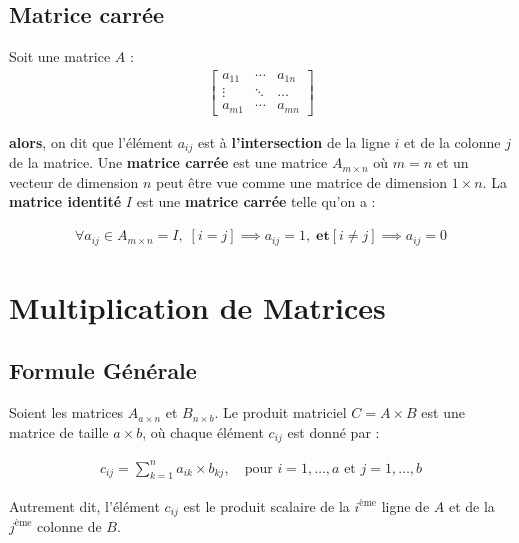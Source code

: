 \documentclass{report}
\begin{document}
\begin{multicols*}{2}
\subsection{Matrice carrée}

    Soit une matrice $A$ : 
        \begin{align*}
                        \begin{bmatrix} 
            a_{11} &  \cdots & a_{1n}  \\ 
            \vdots &  \ddots & \ldots \\ 
            a_{m1} &  \cdots & a_{mn}
            \end{bmatrix}
        \end{align*}

    \textbf{alors},  on dit que l'élément $a_{ij}$ est à
    \textbf{l'intersection} de la ligne  $i$ et de la colonne $j$      
    de la matrice.  Une \textbf{matrice carrée} est une 
    matrice $A_{m \times n}$ où $m = n$ et un vecteur de dimension $n$ 
    peut être vue comme une matrice de dimension $1 \times n$. 
    La \textbf{matrice identité} $I$ est 
    une \textbf{matrice carrée} telle qu'on a : 

    \begin{align*}
        \boxed{\forall a_{ij} \in A_{m \times n} = I, \; 
        \left[  i = j \right] \implies a_{ij} = 1,  \; \textbf{et}  
        \left[ i \neq j \right] \implies a_{ij} = 0 
    }
    \end{align*}


\section{Multiplication de Matrices}

\subsection{Formule Générale}

Soient les matrices \( A_{a\times n} \)  et \( B_{n \times b} \). Le produit matriciel \( C = A \times B \) est une matrice de taille \( a \times b \), où chaque élément \( c_{ij} \) est donné par :

\begin{align*}
    c_{ij} = \sum_{k=1}^{n} a_{ik} \times b_{kj}, \quad \text{pour } i = 1, \dots, a \text{ et } j = 1, \dots, b
\end{align*}

\noindent
Autrement dit, l'élément \( c_{ij} \) est le produit scalaire de la \( i^\text{ème} \) ligne de \( A \) et de la \( j^\text{ème} \) colonne de \( B \).


\end{multicols*}
\end{document}
